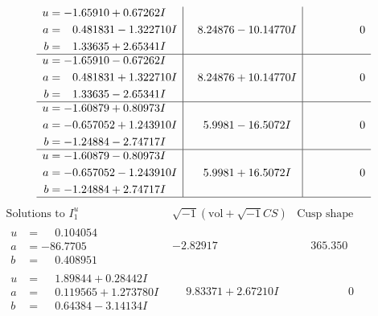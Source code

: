 \documentclass[1p]{elsarticle_modified}
\theoremstyle{definition}
\newcommand{\I}{\sqrt{-1}}
\begin{document}
$$\begin{array}{c|c|c}
\begin{aligned}
u &= -1.65910 + 0.67262 I \\
a &= \phantom{-}0.481831 - 1.322710 I \\
b &= \phantom{-}1.33635 + 2.65341 I\end{aligned}
 & \phantom{-}8.24876 - 10.14770 I & \phantom{-0.000000 } 0 \\ \hline\begin{aligned}
u &= -1.65910 - 0.67262 I \\
a &= \phantom{-}0.481831 + 1.322710 I \\
b &= \phantom{-}1.33635 - 2.65341 I\end{aligned}
 & \phantom{-}8.24876 + 10.14770 I & \phantom{-0.000000 } 0 \\ \hline\begin{aligned}
u &= -1.60879 + 0.80973 I \\
a &= -0.657052 + 1.243910 I \\
b &= -1.24884 - 2.74717 I\end{aligned}
 & \phantom{-}5.9981 - 16.5072 I & \phantom{-0.000000 } 0 \\ \hline\begin{aligned}
u &= -1.60879 - 0.80973 I \\
a &= -0.657052 - 1.243910 I \\
b &= -1.24884 + 2.74717 I\end{aligned}
 & \phantom{-}5.9981 + 16.5072 I & \phantom{-0.000000 } 0\\
 \hline 
 \end{array}$$\newpage$$\begin{array}{c|c|c}  
\text{Solutions to }I^u_{1}& \I (\text{vol} + \sqrt{-1}CS) & \text{Cusp shape}\\
 \hline 
\begin{aligned}
u &= \phantom{-}0.104054\phantom{ +0.000000I} \\
a &= -86.7705\phantom{ +0.000000I} \\
b &= \phantom{-}0.408951\phantom{ +0.000000I}\end{aligned}
 & -2.82917\phantom{ +0.000000I} & \phantom{-}365.350\phantom{ +0.000000I} \\ \hline\begin{aligned}
u &= \phantom{-}1.89844 + 0.28442 I \\
a &= \phantom{-}0.119565 + 1.273780 I \\
b &= \phantom{-}0.64384 - 3.14134 I\end{aligned}
 & \phantom{-}9.83371 + 2.67210 I & \phantom{-0.000000 } 0 \\ \hline\begin{aligned}

\end{aligned}
\end{array}$$
\end{document}
